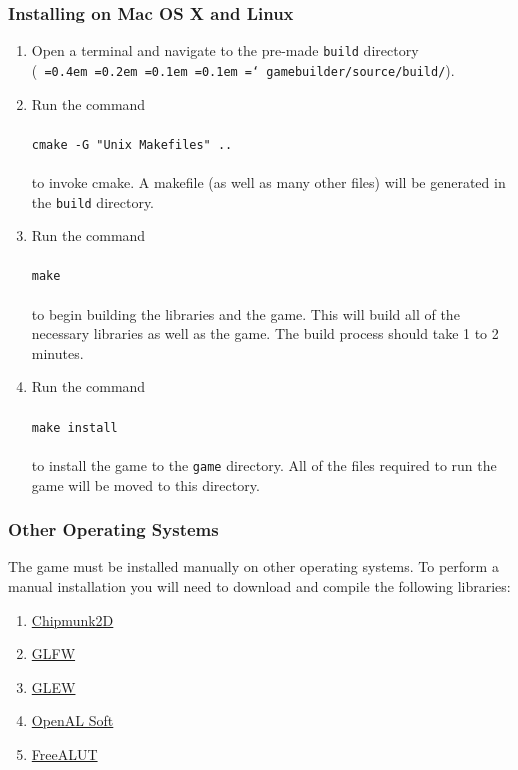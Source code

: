 \documentclass[12pt, titlepage]{article}
\newcommand*\justify{%
  \fontdimen2\font=0.4em%
  \fontdimen3\font=0.2em%
  \fontdimen4\font=0.1em%
  \fontdimen7\font=0.1em%
  \hyphenchar\font=`\-%
}
\begin{document}
\subsubsection{Installing on Mac OS X and Linux}


\begin{enumerate}
  \item Open a terminal and navigate to the pre-made \texttt{build} directory\\ (\texttt{\justify gamebuilder/source/build/}).
  \item Run the command\\\\
   ${}$\qquad \texttt{cmake -G "Unix Makefiles" ..}\\\\
    to invoke cmake.  A makefile (as well as many other files) will be generated in the \texttt{build} directory.

  \item Run the command\\\\
   ${}$\qquad \texttt{make}\\\\
    to begin building the libraries and the game.  This will build all of the necessary libraries as well as the game.  The build process should take 1 to 2 minutes.

  \item Run the command\\\\
  ${}$\qquad \texttt{make install}\\\\
  to install the game to the \texttt{game} directory.  All of the files required to run the game will be moved to this directory.
\end{enumerate}

\subsubsection{Other Operating Systems}
The game must be installed manually on other operating systems.  To perform a manual installation you will need to download and compile the following libraries:

\begin{enumerate}
  \item \href{https://chipmunk-physics.net/}{Chipmunk2D}
  \item \href{http://www.glfw.org/}{GLFW}
  \item \href{http://www.glew.org/}{GLEW}
  \item \href{http://kcat.strangesoft.net/openal.html}{OpenAL Soft}
  \item \href{https://github.com/vancegroup/freealut}{FreeALUT}
\end{enumerate}
\end{document}
